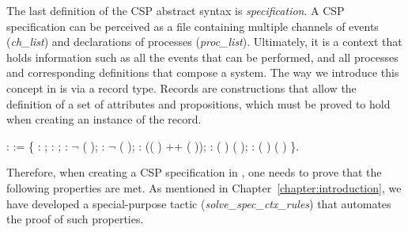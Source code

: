 The last definition of the CSP abstract syntax is \emph{specification}. A CSP specification can be perceived as a file containing multiple channels of events (\emph{ch\_list}) and declarations of processes (\emph{proc\_list}). Ultimately, it is a context that holds information such as all the events that can be performed, and all processes and corresponding definitions that compose a system. The way we introduce this concept in \CSPcoq{} is via a record type. Records are constructions that allow the definition of a set of attributes and propositions, which must be proved to hold when creating an instance of the record.

\begin{coqdoccode}
	\coqdocnoindent
	  :  :=  \{\coqdoceol
	\coqdocindent{1.00em}
	 :  ;\coqdoceol
	\coqdocindent{1.00em}
	 :  ;\coqdoceol
	\coqdocindent{1.00em}
	 : \ensuremath{\lnot}   (  );\coqdoceol
	\coqdocindent{1.00em}
	 : \ensuremath{\lnot}   ( );\coqdoceol
	\coqdocindent{1.00em}
	 :
	\coqdoceol
	\coqdocindent{2.00em}  (( ) ++ (  ));\coqdoceol
	\coqdocindent{1.00em}
	 :  ( ) (  );\coqdoceol
	\coqdocindent{1.00em}
	 :  ( ) ( )\coqdoceol
	\coqdocnoindent
	\}.\coqdoceol
\end{coqdoccode}

Therefore, when creating a CSP specification in \CSPcoq{}, one needs to prove that the following properties are met. As mentioned in Chapter~\ref{chapter:introduction}, we have developed a special-purpose tactic (\emph{solve\_spec\_ctx\_rules}) that automates the proof of such properties.

